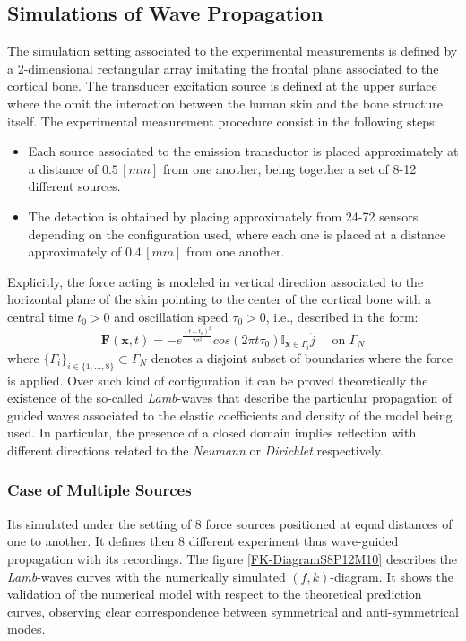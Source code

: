\subsection{Simulations of Wave Propagation}

The simulation setting associated to the experimental measurements is defined by a 2-dimensional rectangular array imitating the frontal plane associated to the cortical bone. The transducer excitation source is defined at the upper surface where the omit the interaction between the human skin and the bone structure itself. 
The experimental measurement procedure consist in the following steps:
\begin{itemize}
    \item Each source associated to the emission transductor is placed approximately at a distance of $0.5 \, [mm]$ from one another, being together a set of 8-12 different sources. 
    \item The detection is obtained by placing approximately from 24-72 sensors depending on the configuration used, where each one is placed at a distance approximately of $0.4 \, [mm]$ from one another.
\end{itemize}
Explicitly, the force acting is modeled in vertical direction associated to the horizontal plane of the skin pointing to the center of the cortical bone with a central time $t_0 > 0$ and oscillation speed $\tau_0 > 0$, i.e., described in the form:
\begin{equation}
    \mathbf{F}(\mathbf{x},t) = - e^{\frac{(t-t_0)^2}{2\sigma^2}} cos( 2 \pi t \tau_0 ) \mathbb{I}_{\mathbf{x} \in \Gamma_i} \hat{j} \quad \text{ on } \Gamma_N
\end{equation}
where $\{ \Gamma_i\}_{ i \in \{1,\dots, 8\}} \subset \Gamma_N$ denotes a disjoint subset of boundaries where the force is applied. 
Over such kind of configuration it can be proved theoretically the existence of the so-called \textit{Lamb}-waves that describe the particular propagation of guided waves associated to the elastic coefficients and density of the model being used.
In particular, the presence of a closed domain implies reflection with different directions related to the \textit{Neumann} or \textit{Dirichlet} respectively.

\subsubsection{Case of Multiple Sources}
Its simulated under the setting of 8 force sources positioned at equal distances of one to another. It defines then 8 different experiment thus wave-guided propagation with its recordings.
The figure \ref{FK-DiagramS8P12M10} describes the \textit{Lamb}-waves curves with the numerically simulated $(f,k)$-diagram. It shows the validation of the numerical model with respect to the theoretical prediction curves, observing clear correspondence between symmetrical and anti-symmetrical modes.

